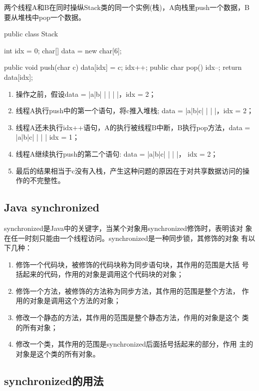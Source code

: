 两个线程A和B在同时操纵Stack类的同一个实例(栈)，A向栈里push一个数据，B要从堆栈中pop一个数据。


\begin{javaCode}
public class Stack {
  int idx = 0;
  char[] data = new char[6];
  
  public void push(char c) {
    data[idx] = c;
    idx++;
  }
  public char pop() {
    idx--;
    return data[idx];
  }
}
\end{javaCode}


\begin{enumerate}
\item 操作之前，假设data = |a|b| | | | |，idx = 2；
\item 线程A执行push中的第一个语句，将c推入堆栈; data = |a|b|c| | | |，idx = 2；
\item 线程A还未执行idx++语句，A的执行被线程B中断，B执行pop方法，data = |a|b|c| | | | idx = 1；
\item 线程A继续执行push的第二个语句: data = |a|b|c| | | |， idx = 2；
\item 最后的结果相当于c没有入栈，产生这种问题的原因在于对共享数据访问的操作的不完整性。
\end{enumerate}

\subsection{Java synchronized}
  
synchronized是Java中的关键字，当某个对象用synchronized修饰时，表明该对
象在任一时刻只能由一个线程访问。synchronized是一种同步锁，其修饰的对象
有以下几种：

\begin{enumerate}
\item 修饰一个代码块，被修饰的代码块称为同步语句块，其作用的范围是大括
  号{}括起来的代码，作用的对象是调用这个代码块的对象；
\item 修饰一个方法，被修饰的方法称为同步方法，其作用的范围是整个方法，
  作用的对象是调用这个方法的对象；
\item 修改一个静态的方法，其作用的范围是整个静态方法，作用的对象是这个
  类的所有对象；
\item 修改一个类，其作用的范围是synchronized后面括号括起来的部分，作用
  主的对象是这个类的所有对象。
\end{enumerate}

\subsection{synchronized的用法}

